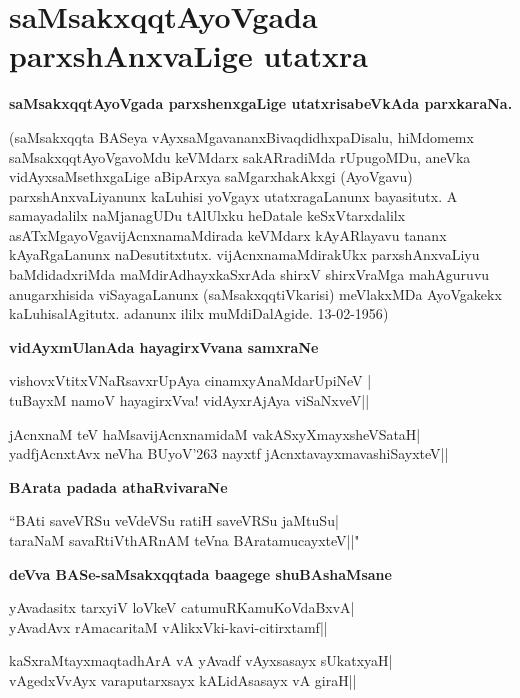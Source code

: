 \chapter{saMsakxqqtAyoVgada parxshAnxvaLige utatxra}

\textbf{saMsakxqqtAyoVgada parxshenxgaLige utatxrisabeVkAda parxkaraNa.}

(saMsakxqqta BASeya vAyxsaMgavananxBivaqdidhxpaDisalu, hiMdomemx saMsakxqqtAyoVgavoMdu keVMdarx sakARradiMda rUpugoMDu, aneVka vidAyxsaMsethxgaLige aBipArxya saMgarxhakAkxgi (AyoVgavu) parxshAnxvaLiyanunx kaLuhisi yoVgayx utatxragaLanunx bayasitutx. A samayadalilx naMjanagUDu tAlUlxku heDatale keSxVtarxdalilx asATxMgayoVgavijAcnxnamaMdirada keVMdarx kAyARlayavu tananx kAyaRgaLanunx naDesutitxtutx. vijAcnxnamaMdirakUkx  parxshAnxvaLiyu baMdidadxriMda maMdirAdhayxkaSxrAda shirxV shirxVraMga mahAguruvu anugarxhisida viSayagaLanunx (saMsakxqqtiVkarisi) meVlakxMDa AyoVgakekx kaLuhisalAgitutx. adanunx ililx muMdiDalAgide. {\rm 13-02-1956})  

\textbf{vidAyxmUlanAda hayagirxVvana samxraNe}

\begin{shloka}
vishovxVtitxVNaRsavxrUpAya cinamxyAnaMdarUpiNeV |\\
tuBayxM namoV hayagirxVva! vidAyxrAjAya viSaNxveV||
\end{shloka}

\begin{shloka}
jAcnxnaM teV haMsavijAcnxnamidaM vakASxyXmayxsheVSataH|\\
yadfjAcnxtAvx neVha BUyoV\char'263 nayxtf jAcnxtavayxmavashiSayxteV||
\end{shloka}

\textbf{BArata padada athaRvivaraNe}

\begin{shloka}
``BAti saveVRSu veVdeVSu ratiH saveVRSu jaMtuSu|\\
taraNaM savaRtiVthARnAM teVna BAratamucayxteV||"
\end{shloka}

\textbf{deVva BASe-saMsakxqqtada baagege shuBAshaMsane}

\begin{shloka}
yAvadasitx tarxyiV loVkeV catumuRKamuKoVdaBxvA|\\
yAvadAvx rAmacaritaM vAlikxVki-kavi-citirxtamf||
\end{shloka}

\begin{shloka}
kaSxraMtayxmaqtadhArA vA yAvadf vAyxsasayx sUkatxyaH|\\
vAgedxVvAyx varaputarxsayx kALidAsasayx vA giraH||
\end{shloka}

